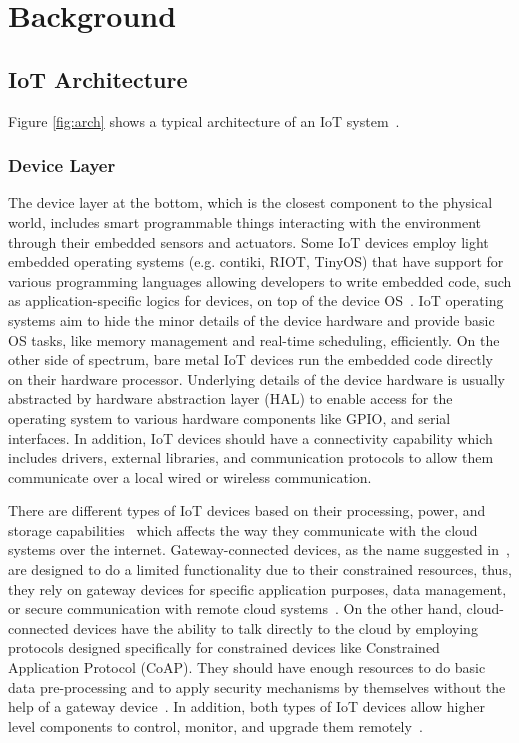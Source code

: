
\chapter{Background}
\label{ch:background}

\section{IoT Architecture}
Figure \autoref{fig:arch} shows a typical architecture of an IoT system~\citep{towardsIoTDefinition,stojkoska2017review,vcolakovic2018IoT,eclipse2016three}. 

\subsection{Device Layer}
The device layer at the bottom, which is the closest component to the physical world, includes smart programmable things interacting with the environment through their embedded sensors and actuators. Some IoT devices employ light embedded operating systems (e.g. contiki, RIOT, TinyOS) that have support for various programming languages allowing developers to write embedded code, such as application-specific logics for devices, on top of the device OS~\cite{javed2018OS}. IoT operating systems aim to hide the minor details of the device hardware and provide basic OS tasks, like memory management and real-time scheduling, efficiently\cite{javed2018OS}. On the other side of spectrum, bare metal IoT devices run the embedded code directly on their hardware processor. Underlying details of the device hardware is usually abstracted by hardware abstraction layer (HAL) to enable access for the operating system to various hardware components like GPIO, and serial interfaces\cite{eclipse2016three}. In addition, IoT devices should have a connectivity capability which includes drivers, external libraries, and communication protocols to allow them communicate over a local wired or wireless communication.

There are different types of IoT devices based on their processing, power, and storage capabilities~\cite{bormann2014terminology} which affects the way they communicate with the cloud systems over the internet. Gateway-connected devices, as the name suggested in~\cite{securityUsenix2019}, are designed to do a limited functionality due to their constrained resources, thus, they rely on gateway devices for specific application purposes, data management, or secure communication with remote cloud systems~\cite{bormann2014terminology}. On the other hand, cloud-connected devices have the ability to talk directly to the cloud by employing protocols designed specifically for constrained devices like Constrained Application Protocol (CoAP). They should have enough resources to do basic data pre-processing and to apply security mechanisms by themselves without the help of a gateway device~\cite{stojkoska2017review,securityUsenix2019}. In addition, both types of IoT devices allow higher level components to control, monitor, and upgrade them remotely~\cite{eclipse2016three}.


